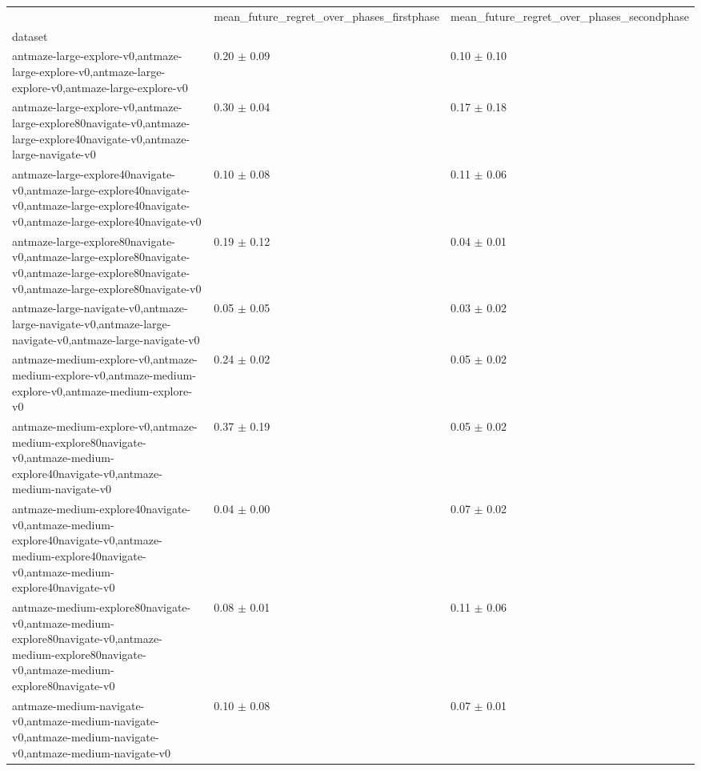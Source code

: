 \begin{tabular}{lll}
\toprule
 & mean_future_regret_over_phases_firstphase & mean_future_regret_over_phases_secondphase \\
dataset &  &  \\
\midrule
antmaze-large-explore-v0,antmaze-large-explore-v0,antmaze-large-explore-v0,antmaze-large-explore-v0 & 0.20 $\pm$ 0.09 & 0.10 $\pm$ 0.10 \\
antmaze-large-explore-v0,antmaze-large-explore80navigate-v0,antmaze-large-explore40navigate-v0,antmaze-large-navigate-v0 & 0.30 $\pm$ 0.04 & 0.17 $\pm$ 0.18 \\
antmaze-large-explore40navigate-v0,antmaze-large-explore40navigate-v0,antmaze-large-explore40navigate-v0,antmaze-large-explore40navigate-v0 & 0.10 $\pm$ 0.08 & 0.11 $\pm$ 0.06 \\
antmaze-large-explore80navigate-v0,antmaze-large-explore80navigate-v0,antmaze-large-explore80navigate-v0,antmaze-large-explore80navigate-v0 & 0.19 $\pm$ 0.12 & 0.04 $\pm$ 0.01 \\
antmaze-large-navigate-v0,antmaze-large-navigate-v0,antmaze-large-navigate-v0,antmaze-large-navigate-v0 & 0.05 $\pm$ 0.05 & 0.03 $\pm$ 0.02 \\
antmaze-medium-explore-v0,antmaze-medium-explore-v0,antmaze-medium-explore-v0,antmaze-medium-explore-v0 & 0.24 $\pm$ 0.02 & 0.05 $\pm$ 0.02 \\
antmaze-medium-explore-v0,antmaze-medium-explore80navigate-v0,antmaze-medium-explore40navigate-v0,antmaze-medium-navigate-v0 & 0.37 $\pm$ 0.19 & 0.05 $\pm$ 0.02 \\
antmaze-medium-explore40navigate-v0,antmaze-medium-explore40navigate-v0,antmaze-medium-explore40navigate-v0,antmaze-medium-explore40navigate-v0 & 0.04 $\pm$ 0.00 & 0.07 $\pm$ 0.02 \\
antmaze-medium-explore80navigate-v0,antmaze-medium-explore80navigate-v0,antmaze-medium-explore80navigate-v0,antmaze-medium-explore80navigate-v0 & 0.08 $\pm$ 0.01 & 0.11 $\pm$ 0.06 \\
antmaze-medium-navigate-v0,antmaze-medium-navigate-v0,antmaze-medium-navigate-v0,antmaze-medium-navigate-v0 & 0.10 $\pm$ 0.08 & 0.07 $\pm$ 0.01 \\
\bottomrule
\end{tabular}
